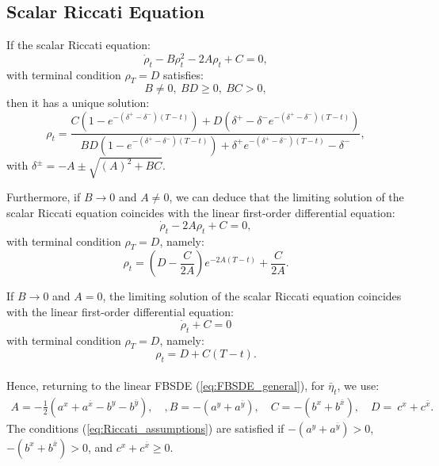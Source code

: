 \documentclass[11pt]{article}
\begin{document}
\begin{appendices}
\subsection*{\textbf{Scalar Riccati Equation}} If the scalar Riccati equation: 
	\begin{equation*}
		\dot{\rho}_t - B \rho_t^2 - 2A \rho_t  + C = 0, 
	\end{equation*}
	with terminal condition $\rho_T = D$ satisfies:
	\begin{equation}
		B \neq 0,\ BD \geq 0,\ BC>0,
	\label{eq:Riccati_assumptions}
	\end{equation}
	then it has a unique solution:
\begin{equation}
		\rho_t= \frac{C(1-e^{-(\delta^+ - \delta^-)(T-t)})+D( \delta^+ -\delta^-e^{-(\delta^+ - \delta^-)(T-t)}) }{BD(1-e^{-(\delta^+ - \delta^-)(T-t)})+ \delta^+e^{-(\delta^+ - \delta^-)(T-t)}  -\delta^- },
	\label{eq:riccati_ut_sol_app}
\end{equation}
	with $\delta^\pm = -A \pm \sqrt{(A)^2 + B C}$.
	
	Furthermore, if $B \to 0$ and $A\neq 0$, we can deduce that the limiting solution of the scalar Riccati equation coincides with the linear first-order differential equation:
	\begin{equation*}
		\dot{\rho}_t - 2A \rho_t +C = 0,
	\end{equation*}
	with terminal condition $\rho_T = D$, namely:
	\begin{equation*}
		\rho_t = \left(D - \frac{C}{2A} \right) e^{-2A (T-t)} + \frac{C}{2A}.
	\end{equation*}
	
	If $B \to 0$ and $A = 0$, the limiting solution of the scalar Riccati equation coincides with the linear first-order differential equation:
	\begin{equation*}
	    \dot{\rho}_t +C = 0
	\end{equation*}
	with terminal condition $\rho_T = D$, namely:
	\begin{equation*}
	    \rho_t = D + C(T-t).
	\end{equation*}\\
Hence, returning to the linear FBSDE (\ref{eq:FBSDE_general}), for $\bar{\eta}_t$, we use:
\begin{equation*}
	\begin{array}{rl}
		A=-\frac{1}{2}(a^x+a^{\bar{x}}-b^y-b^{\bar{y}}), \quad, B=-(a^y+a^{\bar{y}}), \quad C=-(b^x+b^{\bar{x}}),\quad D=\ c^x+c^{\bar{x}}.
	\end{array}
\end{equation*}
The conditions (\ref{eq:Riccati_assumptions}) are satisfied if $-(a^y+a^{\bar{y}})>0$, $-(b^x+b^{\bar{x}})>0$, and $c^x+c^{\bar{x}} \geq 0$.


\end{appendices}
\end{document}
